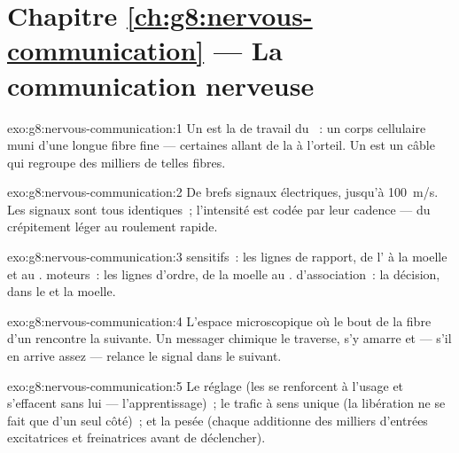 \section*{Chapitre \ref{ch:g8:nervous-communication} --- La communication nerveuse}

\begin{solution}{exo:g8:nervous-communication:1}
Un  est la  de travail du ~: un corps
cellulaire muni d'une longue fibre fine --- certaines allant de la
 à l'orteil. Un  est un câble qui regroupe des
milliers de telles fibres.
\end{solution}

\begin{solution}{exo:g8:nervous-communication:2}
De brefs signaux électriques, jusqu'à \qty{100}{m/s}. Les signaux
sont tous identiques~; l'intensité est codée par leur cadence ---
du crépitement léger au roulement rapide.
\end{solution}

\begin{solution}{exo:g8:nervous-communication:3}
 sensitifs~: les lignes de rapport, de l' à
la moelle et au .  moteurs~: les lignes d'ordre, de
la moelle au .  d'association~: la décision, dans le
 et la moelle.
\end{solution}

\begin{solution}{exo:g8:nervous-communication:4}
L'espace microscopique où le bout de la fibre d'un  rencontre
la  suivante. Un messager chimique le traverse, s'y amarre
et --- s'il en arrive assez --- relance le signal dans le 
suivant.
\end{solution}

\begin{solution}{exo:g8:nervous-communication:5}
Le réglage (les  se renforcent à l'usage et s'effacent sans
lui --- l'apprentissage)~; le trafic à sens unique (la libération ne
se fait que d'un seul côté)~; et la pesée (chaque  additionne
des milliers d'entrées excitatrices et freinatrices avant de
déclencher).
\end{solution}

